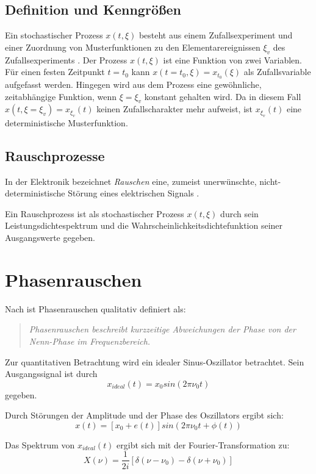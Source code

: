\subsection{Definition und Kenngrößen}
Ein stochastischer Prozess $x(t,\xi)$ besteht aus einem Zufallsexperiment und einer Zuordnung von Musterfunktionen zu den Elementarereignissen $\xi_v$ des Zufallsexperiments \cite[S.~243]{Leon2015}. Der Prozess $x(t,\xi)$ ist eine Funktion von zwei Variablen. Für einen festen Zeitpunkt $t=t_0$ kann $x(t=t_0,\xi)=x_{t_0}(\xi)$ als Zufallsvariable aufgefasst werden. Hingegen wird aus dem Prozess eine gewöhnliche, zeitabhängige Funktion, wenn $\xi=\xi_v$ konstant gehalten wird. Da in diesem Fall $x(t,\xi=\xi_v)=x_{\xi_v}(t)$ keinen Zufallscharakter mehr aufweist, ist $x_{\xi_v}(t)$ eine deterministische Musterfunktion.

\subsection{Rauschprozesse}
In der Elektronik bezeichnet \textit{Rauschen} eine, zumeist unerwünschte, nicht-\-deterministische Störung eines elektrischen Signals \cite{Heuermann2018}.

Ein Rauschprozess ist als stochastischer Prozess $x(t,\xi)$ durch sein Leistungsdichtespektrum und die Wahrscheinlichkeitsdichtefunktion seiner Ausgangswerte gegeben.

\section{Phasenrauschen}
Nach \cite{IEEErandom} ist Phasenrauschen qualitativ definiert als:
\begin{quote}
		\textit{Phasenrauschen beschreibt kurzzeitige Abweichungen der Phase von der Nenn-Phase im Frequenzbereich.} 
\end{quote}

Zur quantitativen Betrachtung wird ein idealer Sinus-Oszillator betrachtet. Sein Ausgangssignal ist durch
\begin{equation}
\label{eq:sinIdeal}
	x_{ideal}(t)=x_0 sin(2\pi \nu_0 t)
\end{equation}
gegeben.

Durch Störungen der Amplitude und der Phase des Oszillators ergibt sich:
\begin{equation}
	x(t)=[x_0 + e(t)] sin\left(2\pi \nu_0 t + \phi(t)\right)
\end{equation}

Das Spektrum von $x_{ideal}(t)$ ergibt sich mit der Fourier-Transformation zu:
\begin{equation}
	X(\nu)=\frac{1}{2 i} \left[ \delta(\nu-\nu_0) - \delta(\nu+\nu_0) \right]
\end{equation}

